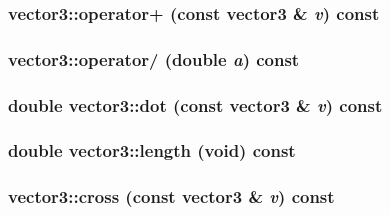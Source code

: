 \subsubsection{ vector3::operator+ (const {\bf vector3} \& {\em v}) const\hspace{0.3cm}{\tt  [inline]}}\label{structvector3_586fe5d8bfa9b20470aa8b01407d8a3d}


\subsubsection{ vector3::operator/ (double {\em a}) const\hspace{0.3cm}{\tt  [inline]}}\label{structvector3_19c3ff118634eb77e0572292c5d2aa96}


\subsubsection{\setlength{\rightskip}{0pt plus 5cm}double vector3::dot (const {\bf vector3} \& {\em v}) const\hspace{0.3cm}{\tt  [inline]}}\label{structvector3_82f3dc9b33d92b0382d73c8f2745ead8}


\subsubsection{\setlength{\rightskip}{0pt plus 5cm}double vector3::length (void) const\hspace{0.3cm}{\tt  [inline]}}\label{structvector3_8e6316e1db80fcded3840f703560c3d0}


\subsubsection{ vector3::cross (const {\bf vector3} \& {\em v}) const\hspace{0.3cm}{\tt  [inline]}}\label{structvector3_b0cdde2821ccf93d4189ebbac351268f}


